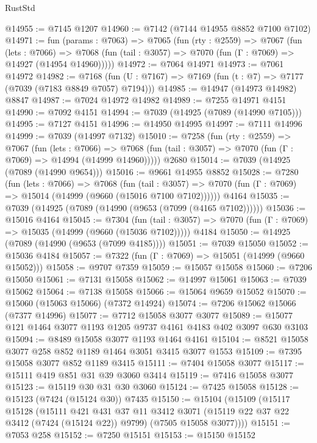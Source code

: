 \begin{lexlean}{RustStd}
\begin{coremodule}
{\begin{coremodule}
{{{{{{{{{{{{{{{{{{{{{{{{{{{{{{{{@14955 := @7145 @1207
@14960 := @7142 (@7144 @14955 @8852 @7100 @7102)
@14971 := fun (params : @7063) =>
  @7065
    (fun (rty : @2559) =>
    @7067
      (fun (lets : @7066) =>
      @7068 (fun (tail : @3057) => @7070 (fun (Γ : @7069) => @14927 (@14954 @14960)))))
@14972 := @7064 @14971
@14973 := @7061 @14972
@14982 := @7168 (fun (U : @7167) => @7169 (fun (t : @7) => @7177 (@7039 (@7183 @8849 @7057) @7194)))
@14985 := @14947 (@14973 @14982) @8847
@14987 := @7024 @14972 @14982
@14989 := @7255 @14971 @4151
@14990 := @7092 @4151
@14994 := @7039 (@14925 (@7089 (@14990 @7105)))
@14995 := @7127 @4151
@14996 := @14950 @14995
@14997 := @7111 @14996
@14999 := @7039 (@14997 @7132)
@15010 := @7258
    (fun (rty : @2559) =>
    @7067
      (fun (lets : @7066) =>
      @7068 (fun (tail : @3057) => @7070 (fun (Γ : @7069) => @14994 (@14999 @14960)))))
    @2680
@15014 := @7039 (@14925 (@7089 (@14990 @9654)))
@15016 := @9661 @14955 @8852
@15028 := @7280
    (fun (lets : @7066) =>
    @7068
      (fun (tail : @3057) =>
      @7070 (fun (Γ : @7069) => @15014 (@14999 (@9660 (@15016 @7100 @7102))))))
    @4164
@15035 := @7039 (@14925 (@7089 (@14990 (@9653 (@7099 (@4165 @7102))))))
@15036 := @15016 @4164
@15045 := @7304
    (fun (tail : @3057) => @7070 (fun (Γ : @7069) => @15035 (@14999 (@9660 (@15036 @7102)))))
    @4184
@15050 := @14925 (@7089 (@14990 (@9653 (@7099 @4185))))
@15051 := @7039 @15050
@15052 := @15036 @4184
@15057 := @7322 (fun (Γ : @7069) => @15051 (@14999 (@9660 @15052)))
@15058 := @9707 @7359
@15059 := @15057 @15058
@15060 := @7206 @15050
@15061 := @7131 @15058
@15062 := @14997 @15061
@15063 := @7039 @15062
@15064 := @7138 @15058
@15066 := @15064 @9659 @15052
@15070 := @15060 (@15063 @15066) (@7372 @14924)
@15074 := @7206 @15062 @15066 (@7377 @14996)
@15077 := @7712 @15058 @3077 @3077
@15089 := @15077 @121 @1464 @3077 @1193 @1205 @9737 @4161 @4183 @402 @3097 @630 @3103
@15094 := @8489 @15058 @3077 @1193 @1464 @4161
@15104 := @8521 @15058 @3077 @258 @852 @1189 @1464 @3051 @3415 @3077 @1553
@15109 := @7395 @15058 @3077 @852 @1189 @3415
@15111 := @7404 @15058 @3077
@15117 := @15111 @419 @851 @31 @39 @3060 @3414
@15119 := @7416 @15058 @3077
@15123 := @15119 @30 @31 @30 @3060
@15124 := @7425 @15058
@15128 := @15123 (@7424 (@15124 @30)) @7435
@15150 := @15104
    (@15109
      (@15117
        @15128
        (@15111
          @421
          @431
          @37
          @11
          @3412
          @3071
          (@15119 @22 @37 @22 @3412 (@7424 (@15124 @22)) @9799)
          (@7505 @15058 @3077))))
@15151 := @7053 @258
@15152 := @7250 @15151
@15153 := @15150 @15152
}}}}}}}}}}}}}}}}}}}}}}}}}}}}}}}}
\end{coremodule}}
\end{coremodule}
\end{lexlean}
